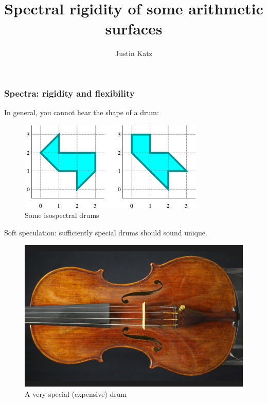 \documentclass{beamer}
\title{Spectral rigidity of some arithmetic surfaces}
\author{Justin Katz}
\institute{Purdue University}
\begin{document}
\frame{\titlepage}



\begin{frame}
	\frametitle{Spectra: rigidity and flexibility}
	In general, you cannot hear the shape of a drum: 
	\pause
	\begin{center}
		\begin{figure}
				\includegraphics[scale=.4]{isospectralDrums}  
				\caption{Some isospectral drums}
		\end{figure}
	\end{center}
	\pause 
	Soft speculation: sufficiently special drums should sound unique.
	\pause
	\begin{center}
		\begin{figure}		\includegraphics[scale=.18]{fancyViolin.png}
			\caption{A very special (expensive) drum}
		\end{figure}
	\end{center}
\end{frame}
\end{document}
